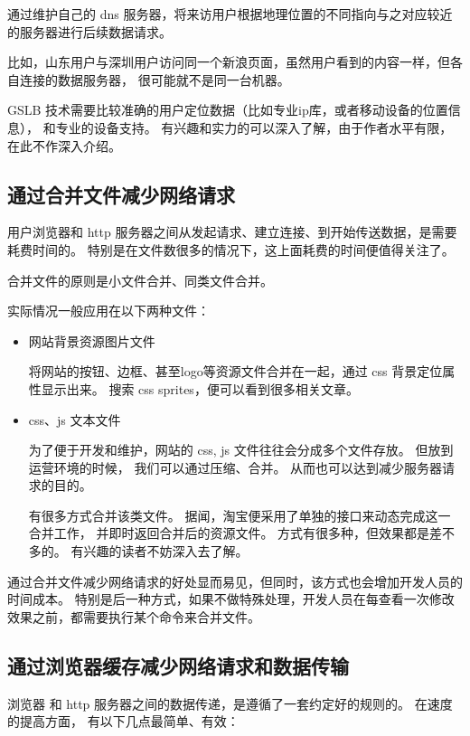 \documentclass{article}
\begin{document}
  通过维护自己的 dns 服务器，将来访用户根据地理位置的不同指向与之对应较近的服务器进行后续数据请求。

  比如，山东用户与深圳用户访问同一个新浪页面，虽然用户看到的内容一样，但各自连接的数据服务器，
  很可能就不是同一台机器。

  GSLB 技术需要比较准确的用户定位数据（比如专业ip库，或者移动设备的位置信息），
  和专业的设备支持。 有兴趣和实力的可以深入了解，由于作者水平有限，在此不作深入介绍。
  
  \subsection{通过合并文件减少网络请求}

  用户浏览器和 http 服务器之间从发起请求、建立连接、到开始传送数据，是需要耗费时间的。
  特别是在文件数很多的情况下，这上面耗费的时间便值得关注了。

  合并文件的原则是小文件合并、同类文件合并。

  实际情况一般应用在以下两种文件：

  \begin{itemize}
  \item 网站背景资源图片文件

    将网站的按钮、边框、甚至logo等资源文件合并在一起，通过 css 背景定位属性显示出来。
    搜索 css sprites，便可以看到很多相关文章。
    
  \item css、js 文本文件

    为了便于开发和维护，网站的 css, js 文件往往会分成多个文件存放。 但放到运营环境的时候，
    我们可以通过压缩、合并。 从而也可以达到减少服务器请求的目的。

    有很多方式合并该类文件。 据闻，淘宝便采用了单独的接口来动态完成这一合并工作，
    并即时返回合并后的资源文件。 方式有很多种，但效果都是差不多的。 有兴趣的读者不妨深入去了解。
  \end{itemize}

  通过合并文件减少网络请求的好处显而易见，但同时，该方式也会增加开发人员的时间成本。
  特别是后一种方式，如果不做特殊处理，开发人员在每查看一次修改效果之前，都需要执行某个命令来合并文件。
  
  \subsection{通过浏览器缓存减少网络请求和数据传输}

  浏览器 和 http 服务器之间的数据传递，是遵循了一套约定好的规则的。 在速度的提高方面，
  有以下几点最简单、有效：
\end{document}
